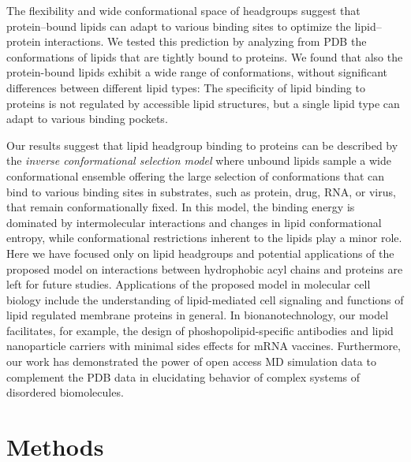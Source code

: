 \documentclass[journal=jpcbfk,manuscript=article]{achemso}
\begin{document}
The flexibility and wide conformational space of headgroups suggest that protein--bound lipids can
adapt to various binding sites to optimize the lipid--protein interactions.
We tested this prediction by analyzing from PDB the conformations of lipids that are tightly bound to proteins.
We found that also the protein-bound lipids exhibit a wide range of conformations, without significant 
differences between different lipid types: The specificity of lipid binding to proteins is not
regulated by accessible lipid structures, but a single lipid type can adapt to various binding pockets.

Our results suggest that lipid headgroup binding to proteins can be described by the {\it inverse conformational selection model}
where unbound lipids sample a wide conformational ensemble offering the large selection of conformations
that can bind to various binding sites in substrates, such as protein, drug, RNA, or virus, that remain conformationally fixed.
In this model, the binding energy is dominated by
intermolecular interactions and changes in lipid conformational entropy, while 
conformational restrictions inherent to the lipids play a minor role.
Here we have focused only on lipid headgroups and potential applications of the proposed model on interactions between hydrophobic acyl chains and proteins are left for future studies. 
Applications of the proposed model in molecular cell biology include the understanding of lipid-mediated cell signaling
and functions of lipid regulated membrane proteins in general. 
In bionanotechnology, our model facilitates, for example,
the design of phoshopolipid-specific antibodies and lipid nanoparticle carriers with minimal sides effects for mRNA vaccines.
Furthermore, our work has demonstrated the power of open access MD simulation data
to complement the PDB data in elucidating behavior of complex systems of disordered biomolecules.

\section{Methods}
\end{document}
